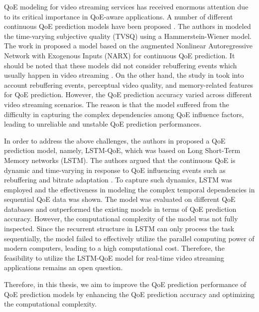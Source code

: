 QoE modeling for video streaming services has received enormous attention due to its critical importance in QoE-aware applications.
A number of different continuous QoE prediction models have been proposed \cite{QoEModel_TimeVaryingSubjectiveQuality, QoeModel_ShortLongTermQualityModel, QoEModel_BitrateDistribution, QoEModel_NARX_DynamicNetworks, QoEModel_AugmentedAutoregressive, QoEModel_TVQoE_ContinuousTimeQoE, QoEModel_NLSS, QoEModel_3D, QoEModel_Wireless}.
The authors in \cite{QoEModel_TimeVaryingSubjectiveQuality} modeled the time-varying subjective quality (TVSQ) using a Hammerstein-Wiener model.
The work in \cite{QoEModel_AugmentedAutoregressive} proposed a model based on the augmented Nonlinear Autoregressive Network with Exogenous Inputs (NARX) for continuous QoE prediction.
It should be noted that these models did not consider rebuffering events which usually happen in video streaming \cite{Survey_QoE, Survey_QoEModeling}.
On the other hand, the study in \cite{QoEModel_NARX_DynamicNetworks} took into account rebuffering events, perceptual video quality, and memory-related features for QoE prediction.
However, the QoE prediction accuracy varied across different video streaming scenarios.
The reason is that the model suffered from the difficulty in capturing the complex dependencies among QoE influence factors, leading to unreliable and unstable QoE prediction performances.


In order to address the above challenges, the authors in \cite{QoEModel_LSTM} proposed a QoE prediction model, namely, LSTM-QoE, which was based on Long Short-Term Memory networks (LSTM).
The authors argued that the continuous QoE is dynamic and time-varying in response to QoE influencing events such as rebuffering \cite{MeasuringQoEOfHTTP} and bitrate adaptation \cite{QoEModel_TimeVaryingSubjectiveQuality}.
To capture such dynamics, LSTM was employed and the effectiveness in modeling the complex temporal dependencies in sequential QoE data was shown.
The model was evaluated on different QoE databases and outperformed the existing models in terms of QoE prediction accuracy.
However, the computational complexity of the model was not fully inspected.
Since the recurrent structure in LSTM can only process the task sequentially, the model failed to effectively utilize the parallel computing power of modern computers, leading to a high computational cost.
Therefore, the feasibility to utilize the LSTM-QoE model for real-time video streaming applications remains an open question.


Therefore, in this thesis, we aim to improve the QoE prediction performance of QoE prediction models by enhancing the QoE prediction accuracy and optimizing the computational complexity.